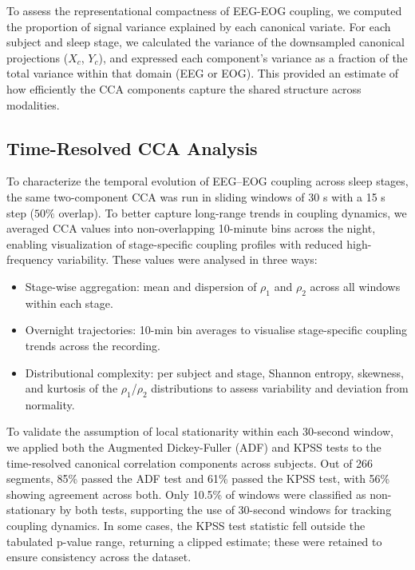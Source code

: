 To assess the representational compactness of EEG-EOG coupling, we computed the proportion of signal variance explained by each canonical variate. For each subject and sleep stage, we calculated the variance of the downsampled canonical projections ($X_c$, $Y_c$), and expressed each component's variance as a fraction of the total variance within that domain (EEG or EOG). This provided an estimate of how efficiently the CCA components capture the shared structure across modalities.

\subsection{Time-Resolved CCA Analysis}

To characterize the temporal evolution of EEG–EOG coupling across sleep stages, the same two-component CCA was run in sliding windows of 30 s with a 15 s step ($50\%$ overlap). To better capture long-range trends in coupling dynamics, we averaged CCA values into non-overlapping 10-minute bins across the night, enabling visualization of stage-specific coupling profiles with reduced high-frequency variability.
These values were analysed in three ways:
\begin{itemize}
    \item Stage-wise aggregation: mean and dispersion of $\rho_1$ and $\rho_2$ across all windows within each stage.
    \item Overnight trajectories: 10-min bin averages to visualise stage-specific coupling trends across the recording.
    \item Distributional complexity: per subject and stage, Shannon entropy, skewness, and kurtosis of the $\rho_1$/$\rho_2$ distributions to assess variability and deviation from normality.
\end{itemize}

To validate the assumption of local stationarity within each 30-second window, we applied both the Augmented Dickey-Fuller (ADF) and KPSS tests to the time-resolved canonical correlation components across subjects. Out of 266 segments, 85\% passed the ADF test and 61\% passed the KPSS test, with 56\% showing agreement across both. Only 10.5\% of windows were classified as non-stationary by both tests, supporting the use of 30-second windows for tracking coupling dynamics. In some cases, the KPSS test statistic fell outside the tabulated p-value range, returning a clipped estimate; these were retained to ensure consistency across the dataset.

